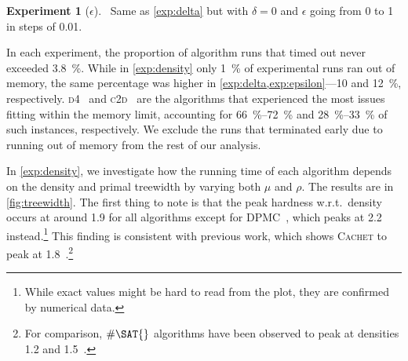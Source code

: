 \documentclass{article}
\theoremstyle{definition}
\newtheorem{experiment}{Experiment}
\begin{document}
\begin{experiment}[$\epsilon$]~\label{exp:epsilon}
  Same as \cref{exp:delta} but with $\delta = 0$ and $\epsilon$ going from 0 to
  1 in steps of 0.01.
\end{experiment}

In each experiment, the proportion of algorithm runs that timed out never
exceeded \SI{3.8}{\percent}. While in \cref{exp:density} only \SI{1}{\percent}
of experimental runs ran out of memory, the same percentage was higher in
\cref{exp:delta,exp:epsilon}---10 and \SI{12}{\percent}, respectively.
\textsc{d4}~\cite{DBLP:conf/ijcai/LagniezM17} and
\textsc{c2d}~\cite{DBLP:conf/ecai/Darwiche04} are the algorithms that
experienced the most issues fitting within the memory limit, accounting for
\SIrange{66}{72}{\percent} and \SIrange{28}{33}{\percent} of such instances,
respectively. We exclude the runs that terminated early due to running out of
memory from the rest of our analysis.

In \cref{exp:density}, we investigate how the running time of each algorithm
depends on the density and primal treewidth by varying both $\mu$ and $\rho$.
The results are in \cref{fig:treewidth}. The first thing to note is that the
peak hardness w.r.t.\ density occurs at around 1.9 for all algorithms except for
\textsc{DPMC}~\cite{DBLP:conf/cp/DudekPV20}, which peaks at 2.2 instead.\footnote{While exact values might be hard to read from the plot, they are confirmed by numerical data.} This finding is consistent with previous work, which shows \textsc{Cachet} to peak at 1.8~\cite{DBLP:conf/sat/SangBBKP04}.\footnote{For comparison, $\#\SAT{}$ algorithms have been observed to peak at densities 1.2 and 1.5~\cite{DBLP:conf/aaai/Pehoushek00}.}
\end{document}
